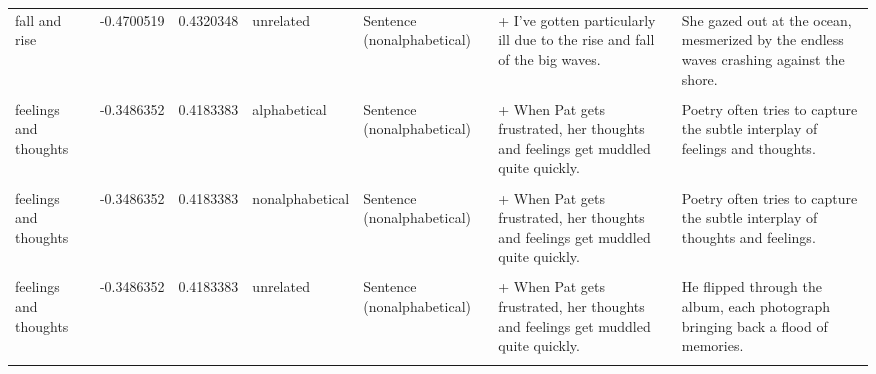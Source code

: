 \documentclass[
  12pt,
]{scrartcl}
\begin{document}
\begin{landscape}
\begin{longtable}{lrrllll}
fall and rise & -0.4700519 & 0.4320348 & unrelated & Sentence (nonalphabetical) & + I've gotten particularly ill due to the rise and fall of the big waves. & She gazed out at the ocean, mesmerized by the endless waves crashing against the shore.\\
\cellcolor{gray!6}{feelings and thoughts} & \cellcolor{gray!6}{-0.3486352} & \cellcolor{gray!6}{0.4183383} & \cellcolor{gray!6}{alphabetical} & \cellcolor{gray!6}{Sentence (alphabetical)} & \cellcolor{gray!6}{+ When Pat gets frustrated, her feelings and thoughts get muddled quite quickly.} & \cellcolor{gray!6}{Poetry often tries to capture the subtle interplay of feelings and thoughts.}\\
feelings and thoughts & -0.3486352 & 0.4183383 & alphabetical & Sentence (nonalphabetical) & + When Pat gets frustrated, her thoughts and feelings get muddled quite quickly. & Poetry often tries to capture the subtle interplay of feelings and thoughts.\\
\addlinespace
\cellcolor{gray!6}{feelings and thoughts} & \cellcolor{gray!6}{-0.3486352} & \cellcolor{gray!6}{0.4183383} & \cellcolor{gray!6}{nonalphabetical} & \cellcolor{gray!6}{Sentence (alphabetical)} & \cellcolor{gray!6}{+ When Pat gets frustrated, her feelings and thoughts get muddled quite quickly.} & \cellcolor{gray!6}{Poetry often tries to capture the subtle interplay of thoughts and feelings.}\\
feelings and thoughts & -0.3486352 & 0.4183383 & nonalphabetical & Sentence (nonalphabetical) & + When Pat gets frustrated, her thoughts and feelings get muddled quite quickly. & Poetry often tries to capture the subtle interplay of thoughts and feelings.\\
\cellcolor{gray!6}{feelings and thoughts} & \cellcolor{gray!6}{-0.3486352} & \cellcolor{gray!6}{0.4183383} & \cellcolor{gray!6}{unrelated} & \cellcolor{gray!6}{Sentence (alphabetical)} & \cellcolor{gray!6}{+ When Pat gets frustrated, her feelings and thoughts get muddled quite quickly.} & \cellcolor{gray!6}{He flipped through the album, each photograph bringing back a flood of memories.}\\
feelings and thoughts & -0.3486352 & 0.4183383 & unrelated & Sentence (nonalphabetical) & + When Pat gets frustrated, her thoughts and feelings get muddled quite quickly. & He flipped through the album, each photograph bringing back a flood of memories.\\
\cellcolor{gray!6}{days and nights} & \cellcolor{gray!6}{0.4144469} & \cellcolor{gray!6}{0.6530894} & \cellcolor{gray!6}{alphabetical} & \cellcolor{gray!6}{Sentence (alphabetical)} & \cellcolor{gray!6}{+ Finn spent many days and nights working on writing his novel.} & \cellcolor{gray!6}{The desert's harshness is evident in the extreme days and nights.}\\

\end{longtable}
\end{landscape}
\end{document}
